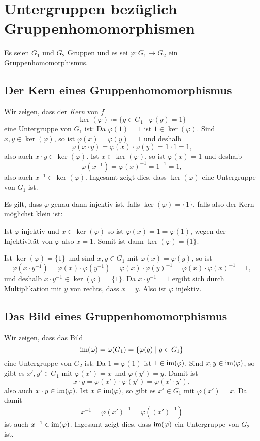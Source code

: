 \section{Untergruppen bezüglich Gruppenhomomorphismen}\label{sec: subgroups and group homomorphisms}
Es seien $G_1$ und $G_2$ Gruppen und es sei $\varphi \colon G_1 \to G_2$ ein Gruppenhomomorphismus.



\subsection{Der Kern eines Gruppenhomomorphismus}
Wir zeigen, dass der \emph{Kern} von $f$
\[
 \ker(\varphi) \coloneqq \{g \in G_1 \mid \varphi(g) = 1\}
\]
eine Untergruppe von $G_1$ ist: Da $\varphi(1) = 1$ ist $1 \in \ker(\varphi)$. Sind $x,y \in \ker(\varphi)$, so ist $\varphi(x) = \varphi(y) = 1$ und deshalb
\[
 \varphi(x \cdot y)
 = \varphi(x) \cdot \varphi(y)
 = 1 \cdot 1
 = 1,
\]
also auch $x \cdot y \in \ker(\varphi)$. Ist $x \in \ker(\varphi)$, so ist $\varphi(x) = 1$ und deshalb
\[
 \varphi(x^{-1})
 = \varphi(x)^{-1}
 = 1^{-1}
 = 1,
\]
also auch $x^{-1} \in \ker(\varphi)$. Ingesamt zeigt dies, dass $\ker(\varphi)$ eine Untergruppe von $G_1$ ist.


\begin{bem}
 Es gilt, dass $\varphi$ genau dann injektiv ist, falls $\ker(\varphi) = \{1\}$, falls also der Kern möglichst klein ist:
 
 Ist $\varphi$ injektiv und $x \in \ker(\varphi)$ so ist $\varphi(x) = 1 = \varphi(1)$, wegen der Injektivität von $\varphi$ also $x = 1$. Somit ist dann $\ker(\varphi) = \{1\}$.
 
 Ist $\ker(\varphi) = \{1\}$ und sind $x,y \in G_1$ mit $\varphi(x) = \varphi(y)$, so ist
 \[
  \varphi(x\cdot y^{-1})
  = \varphi(x)\cdot \varphi(y^{-1})
  = \varphi(x) \cdot \varphi(y)^{-1}
  = \varphi(x) \cdot \varphi(x)^{-1}
  = 1,
 \]
 und deshalb $x \cdot y^{-1} \in \ker(\varphi) = \{1\}$. Da $x \cdot y^{-1} = 1$ ergibt sich durch Multiplikation mit $y$ von rechts, dass $x = y$. Also ist $\varphi$ injektiv.
\end{bem}



\subsection{Das Bild eines Gruppenhomomorphismus}
Wir zeigen, dass das Bild
\[
 \mathrm{im}(\varphi) = \varphi(G_1) = \{\varphi(g) \mid g \in G_1\}
\]
eine Untergruppe von $G_2$ ist: Da $1 = \varphi(1)$ ist $1 \in \mathrm{im}(\varphi)$. Sind $x,y \in \mathrm{im}(\varphi)$, so gibt es $x', y' \in G_1$ mit $\varphi(x') = x$ und $\varphi(y') = y$. Damit ist
\[
 x \cdot y
 = \varphi(x') \cdot \varphi(y')
 = \varphi(x' \cdot y'),
\]
also auch $x \cdot y \in \mathrm{im}(\varphi)$. Ist $x \in \mathrm{im}(\varphi)$, so gibt es $x' \in G_1$ mit $\varphi(x') = x$. Da damit
\[
 x^{-1}
 = \varphi(x')^{-1}
 = \varphi((x')^{-1})
\]
ist auch $x^{-1} \in \mathrm{im}(\varphi)$. Ingesamt zeigt dies, dass $\mathrm{im}(\varphi)$ ein Untergruppe von $G_2$ ist.

